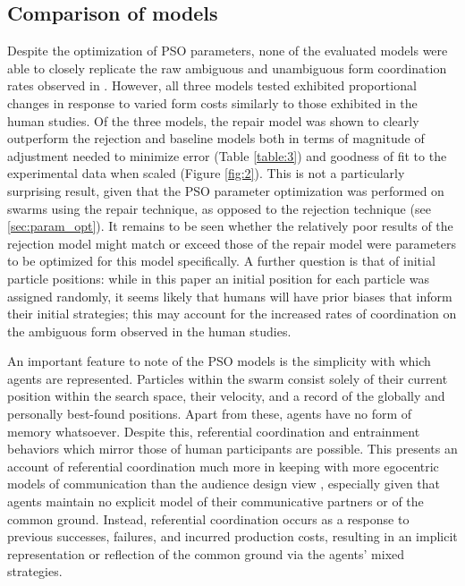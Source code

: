 \documentclass[11pt]{article}
\begin{document}
\subsection{Comparison of models}
Despite the optimization of PSO parameters, none of the evaluated models were able to closely replicate the raw ambiguous and unambiguous form coordination rates observed in \citeauthor{rohde2012}. However, all three models tested exhibited proportional changes in response to varied form costs similarly to those exhibited in the human studies. Of the three models, the repair model was shown to clearly outperform the rejection and baseline models both in terms of magnitude of adjustment needed to minimize error (Table \ref{table:3}) and goodness of fit to the experimental data when scaled (Figure \ref{fig:2}). This is not a particularly surprising result, given that the PSO parameter optimization was performed on swarms using the repair technique, as opposed to the rejection technique (see \ref{sec:param_opt}). It remains to be seen whether the relatively poor results of the rejection model might match or exceed those of the repair model were parameters to be optimized for this model specifically. A further question is that of initial particle positions: while in this paper an initial position for each particle was assigned randomly, it seems likely that humans will have prior biases that inform their initial strategies; this may account for the increased rates of coordination on the ambiguous form observed in the \citeauthor{rohde2012} human studies.

An important feature to note of the PSO models is the simplicity with which agents are represented. Particles within the swarm consist solely of their current position within the search space, their velocity, and a record of the globally and personally best-found positions. Apart from these, agents have no form of memory whatsoever. Despite this, referential coordination and entrainment behaviors which mirror those of human participants are possible. This presents an account of referential coordination much more in keeping with more egocentric models of communication \citep{horton1996} than the audience design view \citep{clark1982}, especially given that agents maintain no explicit model of their communicative partners or of the common ground. Instead, referential coordination occurs as a response to previous successes, failures, and incurred production costs, resulting in an implicit representation or reflection of the common ground via the agents' mixed strategies. 
\end{document}
